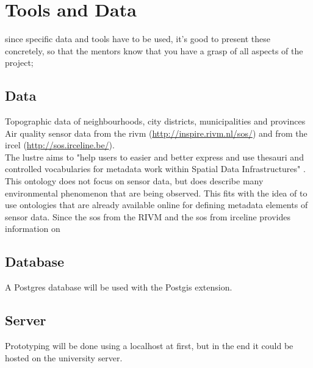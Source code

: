 \chapter{Tools and Data}
\label{chap:TD}

since specific data and tools have to be used, it’s good to present these concretely, so that the mentors know that you have a grasp of all aspects of the project;

\section{Data}
Topographic data of neighbourhoods, city districts, municipalities and provinces\\

Air quality sensor data from the \ac{rivm} (\url{http://inspire.rivm.nl/sos/}) and from the \ac{ircel} (\url{http://sos.irceline.be/}). \\

The \ac{lustre} aims to "help users to easier and better express and use thesauri and controlled vocabularies for metadata work within Spatial Data Infrastructures" \cite[p. 137]{LD:LusTRE}. This ontology does not focus on sensor data, but does describe many environmental phenomenon that are being observed. This fits with the idea of \cite{SSW:Cox4} to use ontologies that are already available online for defining metadata elements of sensor data. Since the \ac{sos} from the \ac{RIVM} and the \ac{sos} from \ac{irceline} provides information on   

\section{Database}
A Postgres database will be used with the Postgis extension.

\section{Server}
Prototyping will be done using a localhost at first, but in the end it could be hosted on the university server.



